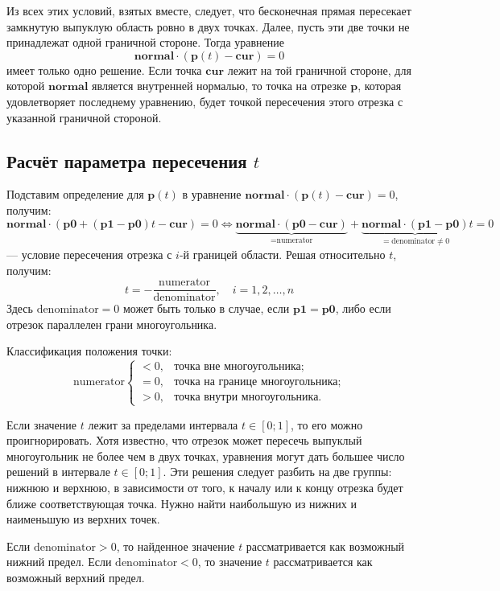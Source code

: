 \documentclass[areasetadvanced]{scrartcl}
\begin{document}
Из всех этих условий, взятых вместе, следует, что бесконечная прямая пересекает замкнутую выпуклую область ровно в двух точках. Далее, пусть эти две точки не принадлежат одной граничной стороне. Тогда уравнение 
\[
\mathbf{normal} \cdot (\mathbf{p}(t) - \mathbf{cur}) = 0
\]
имеет только одно решение. Если точка \(\mathbf{cur}\) лежит на той граничной стороне, для которой \(\mathbf{normal}\) является внутренней нормалью, то точка на отрезке \(\mathbf{p}\), которая удовлетворяет последнему уравнению, будет точкой пересечения этого отрезка с указанной граничной стороной.

\subsection{Расчёт параметра пересечения \(t\)}

Подставим определение для \(\mathbf{p}(t)\) в уравнение \(\mathbf{normal} \cdot (\mathbf{p}(t) - \mathbf{cur}) = 0\), получим:
\[
\mathbf{normal} \cdot \left( \mathbf{p0} + (\mathbf{p1} - \mathbf{p0})t - \mathbf{cur} \right) = 0
\iff 
\underbrace{\mathbf{normal} \cdot (\mathbf{p0} - \mathbf{cur})}_{= \text{numerator}} 
+ 
\underbrace{\mathbf{normal} \cdot (\mathbf{p1} - \mathbf{p0})}_{= \text{denominator} \ne 0} t = 0
\]
— условие пересечения отрезка с \(i\)-й границей области. Решая относительно \(t\), получим:
\[
    t = -\frac{\text{numerator}}{\text{denominator}}, \quad i = 1,2, \dots, n
\]  
Здесь \(\text{denominator} = 0\) может быть только в случае, если \(\mathbf{p1} = \mathbf{p0}\), либо если отрезок параллелен грани многоугольника.

Классификация положения точки:
\[
\text{numerator} 
\begin{cases}
< 0, & \text{точка вне многоугольника;} \\
= 0, & \text{точка на границе многоугольника;} \\
> 0, & \text{точка внутри многоугольника.}
\end{cases}
\]

Если значение \(t\) лежит за пределами интервала \(t \in [0; 1]\), то его можно проигнорировать. Хотя известно, что отрезок может пересечь выпуклый многоугольник не более чем в двух точках, уравнения могут дать большее число решений в интервале \(t \in [0; 1]\). Эти решения следует разбить на две группы: нижнюю и верхнюю, в зависимости от того, к началу или к концу отрезка будет ближе соответствующая точка. Нужно найти наибольшую из нижних и наименьшую из верхних точек. 

Если \(\text{denominator} > 0\), то найденное значение \(t\) рассматривается как возможный нижний предел. Если \(\text{denominator} < 0\), то значение \(t\) рассматривается как возможный верхний предел.
\newpage
\end{document}
